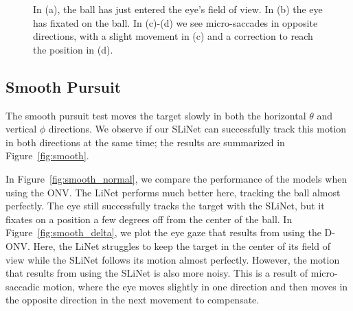 \documentclass [MS] {UCLAthesis}
\begin{document}
\begin{figure}
\begin{subfigure}{0.20\textwidth}
        \caption{}
    \end{subfigure}
    \caption[Fixation simulation with a SLiNet]{In (a), the ball has just entered the eye's field of view. In (b) the eye has fixated on the ball. In (c)-(d) we see micro-saccades in opposite directions, with a slight movement in (c) and a correction to reach the position in (d).}
    \label{fig:fixation}
\end{figure}


\subsection{Smooth Pursuit}

The smooth pursuit test moves the target slowly in both the horizontal $\theta$ and vertical $\phi$ directions. We observe if our SLiNet can successfully track this motion in both directions at the same time; the results are summarized in Figure~\ref{fig:smooth}.

In Figure~\ref{fig:smooth_normal}, we compare the performance of the models when using the ONV. The LiNet performs much better here, tracking the ball almost perfectly. The eye still successfully tracks the target with the SLiNet, but it fixates on a position a few degrees off from the center of the ball. In Figure~\ref{fig:smooth_delta}, we plot the eye gaze that results from using the D-ONV. Here, the LiNet struggles to keep the target in the center of its field of view while the SLiNet follows its motion almost perfectly. However, the motion that results from using the SLiNet is also more noisy. This is a result of micro-saccadic motion, where the eye moves slightly in one direction and then moves in the opposite direction in the next movement to compensate.
\end{document}
